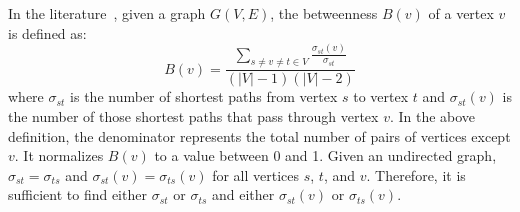 \documentclass[preprint,12pt,authoryear]{elsarticle}
\newcommand{\B}[1]{B({#1})}
\theoremstyle{definition}
\begin{document}

In the literature~\cite{centrality, everett, Brandes01afaster}, given a graph $G(V, E)$, the betweenness $\B{v}$ of a vertex $v$ is defined as:
\begin{equation}\label{bet}
\B{v} = \frac{\sum_{s \neq v \neq t \in V}\frac{\sigma_{st}(v)}{\sigma_{st}}}{(|V|-1)(|V|-2)}
\end{equation} where $\sigma_{st}$ is the number of shortest paths from vertex $s$ to vertex $t$ and $\sigma_{st}(v)$ is the number of those shortest paths that pass through vertex $v$. 
In the above definition, the denominator represents the total number of pairs of vertices except $v$.
It normalizes $\B{v}$ to a value between 0 and 1.
Given an undirected graph, $\sigma_{st}=\sigma_{ts}$ and $\sigma_{st}(v)=\sigma_{ts}(v)$ for all vertices $s$, $t$, and $v$.
Therefore, it is sufficient to find either $\sigma_{st}$ or $\sigma_{ts}$ and either $\sigma_{st}(v)$ or $\sigma_{ts}(v)$.
\end{document}
